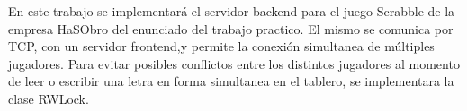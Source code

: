 En este trabajo se implementará el servidor backend para el juego Scrabble de la empresa HaSObro del enunciado del trabajo practico. El mismo se comunica por TCP, con un servidor frontend,y permite la conexión simultanea de múltiples jugadores. Para evitar posibles conflictos entre los distintos jugadores al momento de leer o escribir una letra en forma simultanea en el tablero, se implementara la clase RWLock.